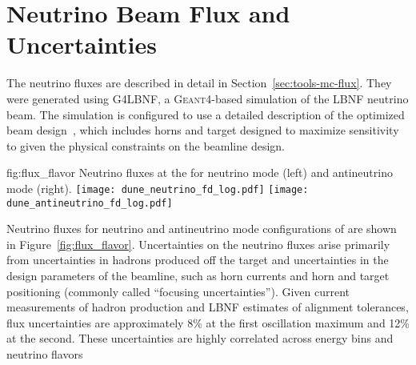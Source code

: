\section{Neutrino Beam Flux and Uncertainties}\label{sec:nu-osc-04}
\label{sec:physics-lbnosc-flux}

The neutrino fluxes are described in detail in Section~\ref{sec:tools-mc-flux}.  They were generated using G4LBNF, a \textsc{Geant}4\xspace-based simulation of the LBNF neutrino beam.  The simulation is configured to use a detailed description of the  optimized beam design~\cite{optimizedbeamcdr}, which includes horns and target designed to maximize sensitivity to  given the physical constraints on the beamline design.   

\begin{dunefigure}{fig:flux_flavor}
{Neutrino fluxes at the  for neutrino mode (left) and
antineutrino mode (right). }
    \texttt{[image: dune\_neutrino\_fd\_log.pdf]}
     \texttt{[image: dune\_antineutrino\_fd\_log.pdf]}
\end{dunefigure}

Neutrino fluxes for neutrino and antineutrino mode configurations of  are shown in Figure~\ref{fig:flux_flavor}.   Uncertainties on the neutrino fluxes arise primarily from uncertainties in hadrons produced off the target and uncertainties in the design parameters of the beamline, such as horn currents and horn and target positioning (commonly called ``focusing uncertainties''). Given current measurements of hadron production and LBNF estimates of alignment tolerances, flux uncertainties are approximately 8\% at the first oscillation maximum and 12\% at the second.  These uncertainties are highly correlated across energy bins and neutrino flavors

